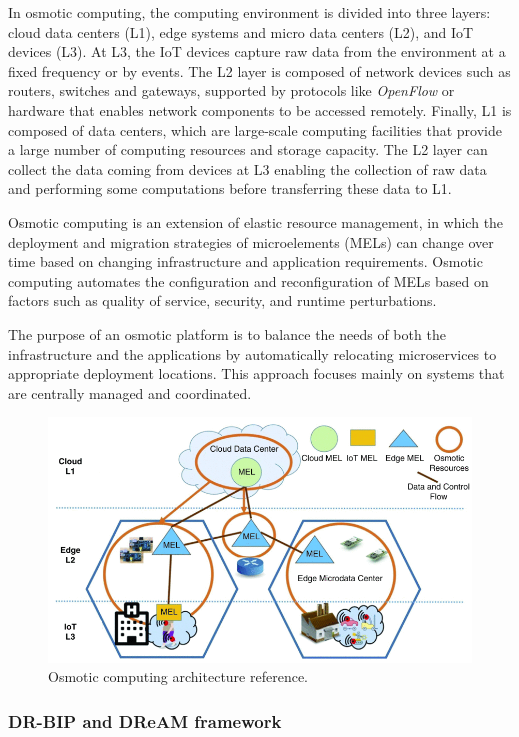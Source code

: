 In osmotic computing, the computing environment is divided into three layers: cloud data centers (L1), edge systems and micro data centers (L2), and
IoT devices (L3).
At L3, the IoT devices capture raw data from the environment at a fixed frequency or by events. The L2 layer is composed of network devices such as
routers, switches and gateways, supported by protocols like \emph{OpenFlow} or hardware that enables network components to be accessed remotely.
Finally, L1 is composed of data centers, which are large-scale computing facilities that provide a large number of computing resources and storage
capacity.
The L2 layer can collect the data coming from devices at L3 enabling the collection of raw data and performing some computations before transferring
these data to L1.

Osmotic computing is an extension of elastic resource management, in which the deployment and migration strategies of microelements (MELs) can change
over time based on changing infrastructure and application requirements. Osmotic computing automates the configuration and reconfiguration of MELs
based on factors such as quality of service, security, and runtime perturbations.

The purpose of an osmotic platform is to balance the needs of both the infrastructure and the applications by automatically relocating microservices
to appropriate deployment locations. This approach focuses mainly on systems that are centrally managed and coordinated.

\begin{figure}
	\centering
	\includegraphics[width=0.8\linewidth]{figures/osmotic-architecture.png}
	\caption{Osmotic computing architecture reference.}
	\label{fig:osmotic-computing}
\end{figure}

\subsubsection{DR-BIP and DReAM framework}

